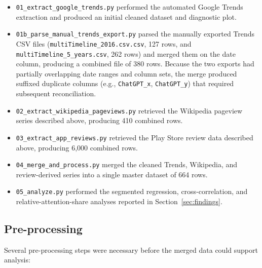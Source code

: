 \documentclass[11pt]{article}
\begin{document}
\begin{itemize}
    \item \texttt{01\_extract\_google\_trends.py} performed the automated Google Trends extraction and produced an initial cleaned dataset and diagnostic plot.
    \item \texttt{01b\_parse\_manual\_trends\_export.py} parsed the manually exported Trends CSV files (\texttt{multiTimeline\_2016.csv.csv}, 127 rows, and \texttt{multiTimeline\_5\_years.csv}, 262 rows) and merged them on the date column, producing a combined file of 380 rows. Because the two exports had partially overlapping date ranges and column sets, the merge produced suffixed duplicate columns (e.g., \texttt{ChatGPT\_x}, \texttt{ChatGPT\_y}) that required subsequent reconciliation.
    \item \texttt{02\_extract\_wikipedia\_pageviews.py} retrieved the Wikipedia pageview series described above, producing 410 combined rows.
    \item \texttt{03\_extract\_app\_reviews.py} retrieved the Play Store review data described above, producing 6,000 combined rows.
    \item \texttt{04\_merge\_and\_process.py} merged the cleaned Trends, Wikipedia, and review-derived series into a single master dataset of 664 rows.
    \item \texttt{05\_analyze.py} performed the segmented regression, cross-correlation, and relative-attention-share analyses reported in Section~\ref{sec:findings}.
\end{itemize}

\subsection{Pre-processing}

Several pre-processing steps were necessary before the merged data could support analysis:
\end{document}
